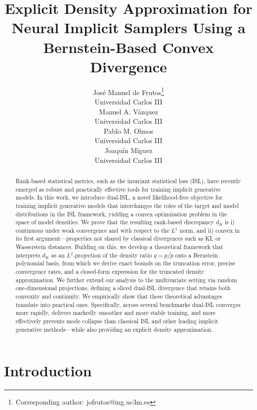 \documentclass{article}
\title{Explicit Density Approximation for Neural Implicit Samplers Using a Bernstein-Based Convex Divergence}
\author{%
  José Manuel de Frutos\thanks{Corresponding author: jofrutos@ing.uc3m.es} \\
  Universidad Carlos III\\
  \And
  Manuel A. Vázquez\\
  Universidad Carlos III\\
  \AND
  Pablo M. Olmos\\
  Universidad Carlos III\\
  \And
  Joaquín Míguez\\
  Universidad Carlos III\\
}
\newcommand\suppressTOCentries{%
    \renewcommand{\addcontentsline}[3]{}%
  }
\begin{document}
\maketitle

\suppressTOCentries
\begin{abstract}

Rank-based statistical metrics, such as the invariant statistical loss (ISL), have recently emerged as robust and practically effective tools for training implicit generative models. In this work, we introduce dual-ISL, a novel likelihood-free objective for training implicit generative models that interchanges the roles of the target and model distributions in the ISL framework, yielding a convex optimization problem in the space of model densities. We prove that the resulting rank-based discrepancy $d_K$ is i) continuous under weak convergence and with respect to the $L^1$ norm, and ii) convex in its first argument—properties not shared by classical divergences such as KL or Wasserstein distances. Building on this, we develop a theoretical framework that interprets $d_K$ as an $L^2$-projection of the density ratio $q = p/\tilde p$ onto a Bernstein polynomial basis, from which we derive exact bounds on the truncation error, precise convergence rates, and a closed-form expression for the truncated density approximation. We further extend our analysis to the multivariate setting via random one-dimensional projections, defining a sliced dual-ISL divergence that retains both convexity and continuity. We empirically show that these theoretical advantages translate into practical ones. Specifically, across several benchmarks dual-ISL converges more rapidly, delivers markedly smoother and more stable training, and more effectively prevents mode collapse than classical ISL and other leading implicit generative methods—while also providing an explicit density approximation. 

\end{abstract}

\section{Introduction}
\end{document}
